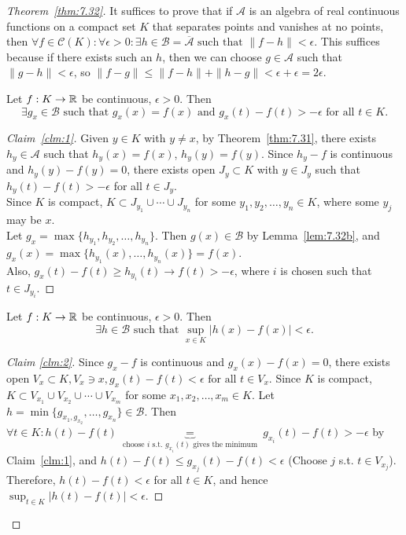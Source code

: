\begin{proof}[Theorem~\ref{thm:7.32}]
	It suffices to prove that if $\mathscr{A}$ is an algebra of real continuous functions on a compact set $K$ that separates points and vanishes at no points, then $\forall{f \in \mathscr{C}(K)}:\forall{\epsilon > 0}: \exists{h \in \mathscr{B}=\overline{\mathscr{A}}} \text{ such that }  \|f-h\|<\epsilon$. This suffices because if there exists such an $h$, then we can choose $g \in \mathscr{A}$ such that $\|g-h\|<\epsilon$, so $\|f-g\|\le \|f-h\|+\|h-g\|<\epsilon+\epsilon=2\epsilon$.\\
	\begin{claim}[1]
		Let $f:K\to \mathbb{R}$ be continuous, $\epsilon>0$. Then \[
			\exists{g_x  \in \mathscr{B}} \text{ such that } g_{x}(x)=f(x) \text{ and } g_{x}(t)-f(t)>-\epsilon \text{ for all } t \in K
			.\]
	\end{claim}
	\begin{proof}[Claim~\ref{clm:1}]
		Given $y \in K$ with $y\neq x$,  by Theorem~\ref{thm:7.31}, there exists $h_y \in \mathscr{A}$ such that $h_y(x)=f(x)$, $h_y(y)=f(y)$.
		Since $h_y -f$ is continuous and $h_y(y)-f(y)=0$, there exists open $J_y \subset K$ with $y \in J_y$ such that $h_y(t)-f(t)>-\epsilon$ for all $t \in J_y$.\\
		Since $K$ is compact, $K \subset J_{y_{1}} \cup \cdots \cup J_{y_{n}}$ for some $y_{1},y_{2}, \ldots ,y_{n} \in K$, where some $y_j$ may be $x$.\\
		Let $g_x=\max\{h_{y_{1}},h_{y_{2}}, \ldots , h_{y_n}\}$. Then $g(x) \in \mathscr{B}$ by Lemma~\ref{lem:7.32b}, and $g_x(x)=\max\{h_{y_{1}}(x), \ldots , h_{y_{n}}(x)\}=f(x)$.\\
		Also, $g_x(t)-f(t)\ge h_{y_i}(t)\to f(t)>-\epsilon$, where $i$ is chosen such that $t \in J_{y_i}$.
	\end{proof}
	\begin{claim}[2]
		Let $f:K\to \mathbb{R}$ be continuous, $\epsilon>0$. Then \[
			\exists{h \in \mathscr{B}} \text{ such that }\sup_{x \in K}\left|h(x)-f(x)\right| <\epsilon
			.\]
	\end{claim}
	\begin{proof}[Claim \ref{clm:2}]
		Since $g_x -f$ is continuous and $g_x(x)-f(x)=0$, there exists open
		${V_x \subset K}, {V_x \ni x}, g_x(t)-f(t) < \epsilon \text{ for all }  t \in V_x $.
		Since $K$ is compact, $K \subset V_{x_{1}} \cup  V _{x_{2}} \cup \cdots \cup V_{x_{m}} $ for some $x_{1},x_{2},\ldots ,x_m \in K$.
		Let $h= \min\{g_{x_{1},g_{x_{2}}}, \ldots ,g_{x_{n}}\} \in \mathscr{B}$.
		Then $\forall{t \in K}: h(t)-f(t)\underbrace{=}_{\text{ choose } i \text{ s.t. } g_{x_i}(t) \text{ gives the minimum }}g_{x_i}(t)-f(t)>-\epsilon $ by Claim~\ref{clm:1}, and $h(t)-f(t) \le g_{x_j}(t)-f(t)<\epsilon$ (Choose $j$ s.t. $t \in V_{x_j}$).
		Therefore, $h(t)-f(t) <\epsilon$ for all $t \in K$, and hence $\sup_{t \in K}\left|h(t)-f(t)\right| < \epsilon$.
	\end{proof}
\end{proof}

